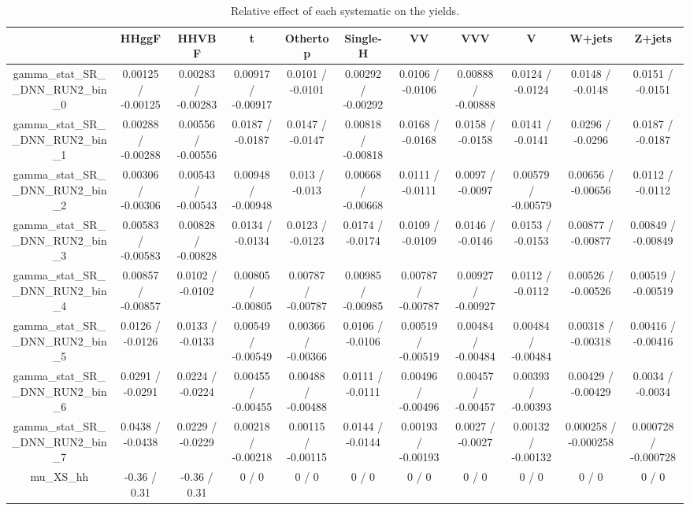 \documentclass[10pt]{article}
\begin{document}
\begin{table}[htbp]
\begin{center}
\begin{tabular}{|c|c|c|c|c|c|c|c|c|c|c|}
\hline 
      & HHggF      & HHVBF      & t      & Othertop      & Single-H      & VV      & VVV      & V      & W+jets      & Z+jets \\ 
\hline 
  gamma_stat_SR__DNN_RUN2_bin_0 & 0.00125 / -0.00125 & 0.00283 / -0.00283 & 0.00917 / -0.00917 & 0.0101 / -0.0101 & 0.00292 / -0.00292 & 0.0106 / -0.0106 & 0.00888 / -0.00888 & 0.0124 / -0.0124 & 0.0148 / -0.0148 & 0.0151 / -0.0151 \\ 
  gamma_stat_SR__DNN_RUN2_bin_1 & 0.00288 / -0.00288 & 0.00556 / -0.00556 & 0.0187 / -0.0187 & 0.0147 / -0.0147 & 0.00818 / -0.00818 & 0.0168 / -0.0168 & 0.0158 / -0.0158 & 0.0141 / -0.0141 & 0.0296 / -0.0296 & 0.0187 / -0.0187 \\ 
  gamma_stat_SR__DNN_RUN2_bin_2 & 0.00306 / -0.00306 & 0.00543 / -0.00543 & 0.00948 / -0.00948 & 0.013 / -0.013 & 0.00668 / -0.00668 & 0.0111 / -0.0111 & 0.0097 / -0.0097 & 0.00579 / -0.00579 & 0.00656 / -0.00656 & 0.0112 / -0.0112 \\ 
  gamma_stat_SR__DNN_RUN2_bin_3 & 0.00583 / -0.00583 & 0.00828 / -0.00828 & 0.0134 / -0.0134 & 0.0123 / -0.0123 & 0.0174 / -0.0174 & 0.0109 / -0.0109 & 0.0146 / -0.0146 & 0.0153 / -0.0153 & 0.00877 / -0.00877 & 0.00849 / -0.00849 \\ 
  gamma_stat_SR__DNN_RUN2_bin_4 & 0.00857 / -0.00857 & 0.0102 / -0.0102 & 0.00805 / -0.00805 & 0.00787 / -0.00787 & 0.00985 / -0.00985 & 0.00787 / -0.00787 & 0.00927 / -0.00927 & 0.0112 / -0.0112 & 0.00526 / -0.00526 & 0.00519 / -0.00519 \\ 
  gamma_stat_SR__DNN_RUN2_bin_5 & 0.0126 / -0.0126 & 0.0133 / -0.0133 & 0.00549 / -0.00549 & 0.00366 / -0.00366 & 0.0106 / -0.0106 & 0.00519 / -0.00519 & 0.00484 / -0.00484 & 0.00484 / -0.00484 & 0.00318 / -0.00318 & 0.00416 / -0.00416 \\ 
  gamma_stat_SR__DNN_RUN2_bin_6 & 0.0291 / -0.0291 & 0.0224 / -0.0224 & 0.00455 / -0.00455 & 0.00488 / -0.00488 & 0.0111 / -0.0111 & 0.00496 / -0.00496 & 0.00457 / -0.00457 & 0.00393 / -0.00393 & 0.00429 / -0.00429 & 0.0034 / -0.0034 \\ 
  gamma_stat_SR__DNN_RUN2_bin_7 & 0.0438 / -0.0438 & 0.0229 / -0.0229 & 0.00218 / -0.00218 & 0.00115 / -0.00115 & 0.0144 / -0.0144 & 0.00193 / -0.00193 & 0.0027 / -0.0027 & 0.00132 / -0.00132 & 0.000258 / -0.000258 & 0.000728 / -0.000728 \\ 
  mu_XS_hh & -0.36 / 0.31 & -0.36 / 0.31 & 0 / 0 & 0 / 0 & 0 / 0 & 0 / 0 & 0 / 0 & 0 / 0 & 0 / 0 & 0 / 0 \\ 
\hline 
\end{tabular} 
\caption{Relative effect of each systematic on the yields.} 
\end{center} 
\end{table} 
\end{document}
